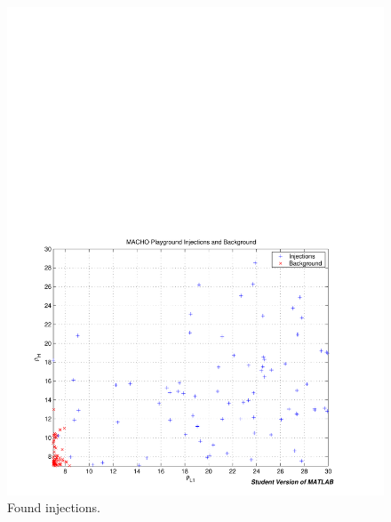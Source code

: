 \begin{figure}[p]
\begin{center}
\includegraphics[width=\textwidth]{analysis/figures/inj_bkg_snr}
\end{center}
\caption{\label{f:inj_bkg_snr}%
Found injections.
}
\end{figure}

